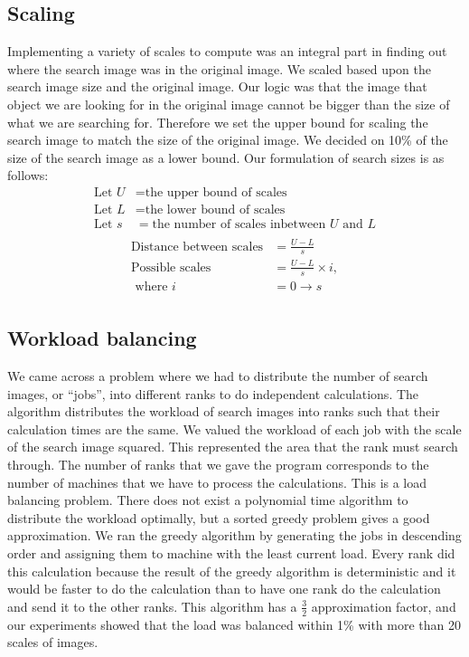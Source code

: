 \documentclass[10pt, journal]{vgtc}                %
\newcommand\tab[1][1cm]{\hspace*{#1}}
\begin{document}
\subsection{Scaling}
\tab Implementing a variety of scales to compute was an integral part in finding out where the search image was in the original image. We scaled based upon the search image size and the original image. Our logic was that the image that object we are looking for in the original image cannot be bigger than the size of what we are searching for. Therefore we set the upper bound for scaling the search image to match the size of the original image. We decided on 10\% of the size of the search image as a lower bound. Our formulation of search sizes is as follows:
\begin{align*}
	\text{Let }U &= \text{the upper bound of scales}\\
	\text{Let }L &= \text{the lower bound of scales}\\
	\text{Let }s &= \text{the number of scales inbetween } U \text{ and } L\\
\end{align*}
\begin{align*}
	\text{Distance} \text{ between scales} &= \frac{U-L}{s}\\
	\text{Poss}\text{ible scales} &=  \frac{U-L}{s} \times i,\\
	\text{ where } i &= 0\rightarrow s\\
\end{align*}
\subsection{Workload balancing}
\tab We came across a problem where we had to distribute the number of search images, or “jobs”, into different ranks to do independent calculations. The algorithm distributes the workload of search images into ranks such that their calculation times are the same. We valued the workload of each job with the scale of the search image squared. This represented the area that the rank must search through. The number of ranks that we gave the program corresponds to the number of machines that we have to process the calculations. This is a load balancing problem. There does not exist a polynomial time algorithm to distribute the workload optimally, but a sorted greedy problem gives a good approximation. We ran the greedy algorithm by generating the jobs in descending order and assigning them to machine with the least current load. Every rank did this calculation because the result of the greedy algorithm is deterministic and it would be faster to do the calculation than to have one rank do the calculation and send it to the other ranks. This algorithm has a $\frac{3}{2}$ approximation factor, and our experiments showed that the load was balanced within 1\% with more than 20 scales of images.  
\end{document}

